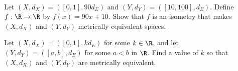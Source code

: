 \begin{comment}
\begin{proof} Let $(X,d)$ be a metric space and let $k$ be a positive real number. Define $kd : X \times X \to \R$ by
\[(kd)(x,y) = kd(x,y)\]
for all $x,y \in X$. Let $x,y, z \in X$. Since $k > 0$ and $d(x,y) \geq 0$, we have  
\[(kd)(x,y) = kd(x,y) \geq 0.\]
Note also that if $x \neq y$ we have $d(x,y) > 0$ and so 
\[(kd)(x,y) = kd(x,y) > 0.\]
In addition, 
\[(kd)(x,x) = kd(x,x) = 0.\]
So $(kd)(x,y) \geq 0$ with equality if and only if $x=y$. 

The symmetry of $kd$ follows from the symmetry of $d$:
\[(kd)(x,y) = kd(x,y) = kd(y,x) = (kd)(y,x).\]

The only property left to verify is the triangle inequality. Now
\[(kd)(x,y) = kd(x,y) \leq k[d(x,z) + d(z,y)] = kd(x,z) + kd(z,y) = (kd)(x,z) + (kd)(z,y).\]
We conclude that $kd$ is a metric on $X$.
\end{proof}
\end{comment}


\begin{activity} ~
\ba
\item Let $(X,d_X) = ([0,1], 90d_E)$ and $(Y,d_Y) = ([10,100], d_E)$. Define $f: \R \to \R$ by $f(x) = 90x+10$. Show that $f$ is an isometry that makes $(X,d_X)$ and $(Y,d_Y)$ metrically equivalent spaces. 

\item Let $(X,d_X) = ([0,1], kd_E)$ for some $k \in \R$, and let $(Y,d_Y) = ([a,b], d_E)$ for some $a<b$ in $\R$. Find a value of $k$ so that $(X, d_X)$ and $(Y, d_Y)$ are metrically equivalent.

  \ea
  
\end{activity}


